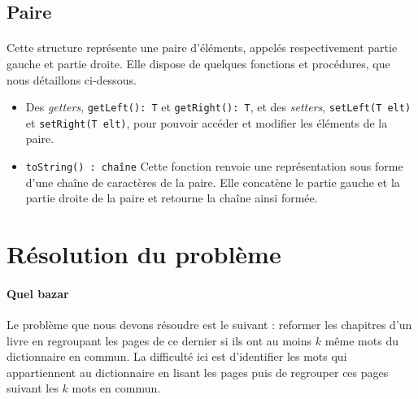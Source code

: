\documentclass[a4paper]{article}
\begin{document}
		\subsection{Paire}
	    	\paragraph{}{Cette structure représente une paire d'éléments, appelés respectivement partie gauche et partie droite. Elle dispose de quelques fonctions et procédures, que nous détaillons ci-dessous.}
	    	
	    	\begin{itemize}
	    	
	    		\item Des \textit{getters}, \verb|getLeft(): T| et \verb|getRight(): T|, et des \textit{setters}, \verb|setLeft(T elt)| et \verb|setRight(T elt)|, pour pouvoir accéder et modifier les éléments de la paire.
	    		
	    		\item \verb|toString() : chaîne| Cette fonction renvoie une représentation sous forme d'une chaîne de caractères de la paire. Elle concatène le partie gauche et la partie droite de la paire et retourne la chaîne ainsi formée.
	    		
	    	\end{itemize}
		
		
	\section{Résolution du problème}
	
		\paragraph{Quel bazar}{
		Le problème que nous devons résoudre est le suivant : reformer les chapitres d'un livre en regroupant les pages 
		de ce dernier si ils ont au moins $k$ même mots du dictionnaire en commun. La difficulté ici est d'identifier
		les mots qui appartiennent au dictionnaire en lisant les pages puis de regrouper ces pages suivant les $k$ mots en
		commun.
		}
	
\end{document}

